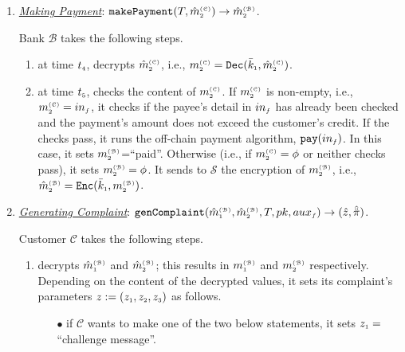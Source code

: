 \begin{enumerate}[leftmargin=.46cm]
\item\label{Making-Payment} \underline{\textit{Making Payment}}: $\mathtt{makePayment}(T, \hat m^{\scriptscriptstyle\mathcal{(C)}}_{\scriptscriptstyle2})\rightarrow \hat m^{\scriptscriptstyle\mathcal{(B)}}_{\scriptscriptstyle2}$.

Bank $\mathcal{B}$ takes the following steps. 
\begin{enumerate}
%
 \item at time $t_{\scriptscriptstyle 4}$, decrypts   $\hat m_{\scriptscriptstyle 2}^{\scriptscriptstyle(\mathcal C)}$, i.e.,  $ m_{\scriptscriptstyle 2}^{\scriptscriptstyle(\mathcal{C})}= \mathtt{Dec}(\bar k_{\scriptscriptstyle 1}, \hat m_{\scriptscriptstyle 2}^{\scriptscriptstyle(\mathcal C)})$.
 \item at time $t_{\scriptscriptstyle 5}$, checks the content of $m_{\scriptscriptstyle 2}^{\scriptscriptstyle(\mathcal C)}$. If $m_{\scriptscriptstyle 2}^{\scriptscriptstyle(\mathcal C)}$ is non-empty, i.e., $m_{\scriptscriptstyle 2}^{\scriptscriptstyle(\mathcal C)}=in_{\scriptscriptstyle f}$, it checks if the payee's detail in $in_{\scriptscriptstyle f}$ has already been checked and the payment's amount does not exceed the customer's credit. If the checks pass, it  runs the off-chain payment algorithm, $\mathtt{pay}(in_{\scriptscriptstyle f})$.  In this case, it sets $m_{\scriptscriptstyle 2}^{\scriptscriptstyle(\mathcal B)}$=``paid''. Otherwise (i.e., if $m_{\scriptscriptstyle 2}^{\scriptscriptstyle(\mathcal C)}=\phi$ or neither checks pass), it sets $m_{\scriptscriptstyle 2}^{\scriptscriptstyle(\mathcal B)}=\phi$. It sends  to $\mathcal{S}$ the encryption of  $m_{\scriptscriptstyle 2}^{\scriptscriptstyle(\mathcal B)}$, i.e., $\hat m_{\scriptscriptstyle 2}^{\scriptscriptstyle(\mathcal{B})}= \mathtt{Enc}(\bar k_{\scriptscriptstyle 1}, m_{\scriptscriptstyle 2}^{\scriptscriptstyle(\mathcal B)})$.  %
\end{enumerate}
%

\item\label{Generating-Complaint}  \underline{\textit{Generating Complaint}}: $\mathtt{genComplaint}(\hat m^{\scriptscriptstyle\mathcal{(B)}}_{\scriptscriptstyle 1}, \hat m^{\scriptscriptstyle\mathcal{(B)}}_{\scriptscriptstyle2}, T, pk,  {aux}_{\scriptscriptstyle f})\rightarrow  (\hat z, \hat{\ddot \pi})$. 

Customer $\mathcal{C}$ takes the following steps. 
\begin{enumerate}
%
\item\label{DR::C-sends-complaint} decrypts $ \hat m^{\scriptscriptstyle\mathcal{(B)}}_{\scriptscriptstyle 1}$ and $\hat m^{\scriptscriptstyle\mathcal{(B)}}_{\scriptscriptstyle2}$; this results in $  m^{\scriptscriptstyle\mathcal{(B)}}_{\scriptscriptstyle 1}$ and $ m^{\scriptscriptstyle\mathcal{(B)}}_{\scriptscriptstyle2}$ respectively. Depending on the content of  the decrypted values, it sets its complaint's parameters $z:=(z_{\scriptscriptstyle 1}, z_{\scriptscriptstyle 2}, z_{\scriptscriptstyle 3})$ as follows.  %

\begin{itemize}
%
%
 \item  [$\bullet$] if $\mathcal{C}$ wants to make one of the two below statements, it sets  $z_{\scriptscriptstyle 1}=$``challenge message''.
 

\end{itemize}
\end{enumerate}
\end{enumerate}
